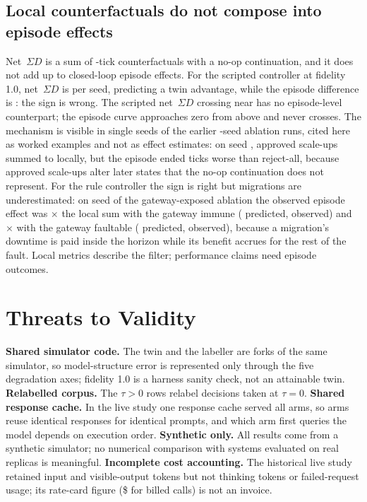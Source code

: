 \documentclass[conference]{IEEEtran}
\newcommand{\netSD}{net~$\Sigma D$}
\newcommand{\NetSD}{Net~$\Sigma D$}
\begin{document}
\subsection{Local counterfactuals do not compose into episode effects}
\NetSD{} is a sum of \Horizon-tick counterfactuals with a no-op continuation, and it does not add up to closed-loop episode effects. For the scripted controller at fidelity 1.0, \netSD{} is \ScrNetTenI{} per seed, predicting a twin advantage, while the episode difference is \ScrEpTenI: the sign is wrong. The scripted \netSD{} crossing near \ScrCrossI{} has no episode-level counterpart; the episode curve approaches zero from above and never crosses. The mechanism is visible in single seeds of the earlier \SignAblationSeeds-seed ablation runs, cited here as worked examples and not as effect estimates: on seed \SignSeed, approved scale-ups summed to \SignPredicted{} locally, but the episode ended \SignObserved{} ticks worse than reject-all, because approved scale-ups alter later states that the no-op continuation does not represent. For the rule controller the sign is right but migrations are underestimated: on seed \MigImmuneSeed{} of the gateway-exposed ablation the observed episode effect was \MigImmuneRatio{}$\times$ the local sum with the gateway immune (\MigImmunePredicted{} predicted, \MigImmuneObserved{} observed) and \MigFaultableRatio{}$\times$ with the gateway faultable (\MigFaultablePredicted{} predicted, \MigFaultableObserved{} observed), because a migration's downtime is paid inside the horizon while its benefit accrues for the rest of the fault. Local metrics describe the filter; performance claims need episode outcomes.

\section{Threats to Validity}
\textbf{Shared simulator code.} The twin and the labeller are forks of the same simulator, so model-structure error is represented only through the five degradation axes; fidelity 1.0 is a harness sanity check, not an attainable twin. \textbf{Relabelled corpus.} The $\tau>0$ rows relabel decisions taken at $\tau=0$. \textbf{Shared response cache.} In the live study one response cache served all arms, so arms reuse identical responses for identical prompts, and which arm first queries the model depends on execution order. \textbf{Synthetic only.} All results come from a synthetic simulator; no numerical comparison with systems evaluated on real replicas is meaningful. \textbf{Incomplete cost accounting.} The historical live study retained input and visible-output tokens but not thinking tokens or failed-request usage; its rate-card figure (\$\LLMRateCardCost{} for \LLMBilledCalls{} billed calls) is not an invoice.
\end{document}
